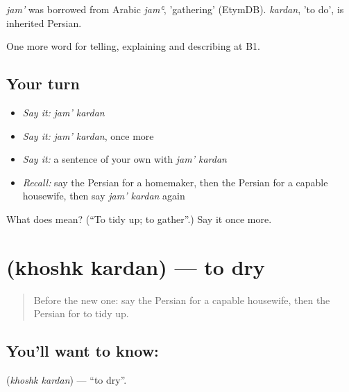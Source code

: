 \begin{cousinweb}
\emph{jam'} was borrowed from Arabic \emph{jamʿ}, 'gathering' (EtymDB). \emph{kardan}, 'to do', is inherited Persian.
\end{cousinweb}

\begin{grammarlens}[title={What you've built}]
One more word for telling, explaining and describing at B1.
\end{grammarlens}

\subsection*{Your turn}
\begin{itemize}
\raggedright
  \item \emph{Say it:} \emph{jam' kardan}
  \item \emph{Say it:} \emph{jam' kardan}, once more
  \item \emph{Say it:} a sentence of your own with \emph{jam' kardan}
  \item \emph{Recall:} say the Persian for a homemaker, then the Persian for a capable housewife, then say \emph{jam' kardan} again
\end{itemize}

\begin{tcolorbox}[breakable,colback=teal!4,colframe=teal!35!black,title={Before you move on}]
What does   mean? (\textquotedblleft{}To tidy up; to gather\textquotedblright{}.) Say it once more.
\end{tcolorbox}
\section[\texorpdfstring{\fa{خشک} \fa{کردن} (khoshk kardan)}{خشک کردن (khoshk kardan)}]{  (khoshk kardan) — to dry}

\label{lesson:FA-C536-khoshk-kardan}



\begin{quote}
Before the new one: say the Persian for a capable housewife, then the Persian for to tidy up.
\end{quote}

\subsection*{You'll want to know:  }
\textbf{ } (\emph{khoshk kardan}) — \textquotedblleft{}to dry\textquotedblright{}.

